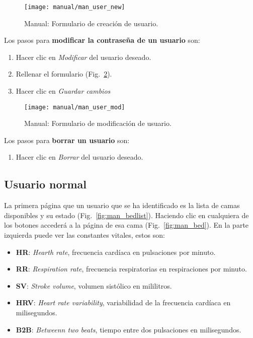 \begin{figure}
	\centering
	\texttt{[image: manual/man\_user\_new]}
	\caption{Manual: Formulario de creación de usuario.}
	\label{fig:man_new_user}
\end{figure}

Los pasos para \textbf{modificar la contraseña de un usuario} son:
\begin{enumerate}
	\item Hacer clic en \textit{Modificar} del usuario deseado.
	\item Rellenar el formulario (Fig.~\ref{fig:man_mod_user}).
	\item Hacer clic en \textit{Guardar cambios}
\end{enumerate}

\begin{figure}
	\centering
	\texttt{[image: manual/man\_user\_mod]}
	\caption{Manual: Formulario de modificación de usuario.}
	\label{fig:man_mod_user}
\end{figure}

Los pasos para \textbf{borrar un usuario} son:
\begin{enumerate}
	\item Hacer clic en \textit{Borrar} del usuario deseado.
\end{enumerate}

\subsection{Usuario normal}\label{sec:normal_tuto}

La primera página que un usuario que se ha identificado es la lista de camas disponibles y su estado (Fig.~\ref{fig:man_bedlist}). Haciendo clic en cualquiera de los botones accederá a la página de esa cama (Fig.~\ref{fig:man_bed}). En la parte izquierda puede ver las constantes vitales, estos son:
\begin{itemize}
	\item \textbf{HR}: \textit{Hearth rate}, frecuencia cardíaca en pulsaciones por minuto.
	\item \textbf{RR}: \textit{Respiration rate}, frecuencia respiratorias en respiraciones por minuto.
	\item \textbf{SV}: \textit{Stroke volume}, volumen sistólico en mililitros.
	\item \textbf{HRV}: \textit{Heart rate variability}, variabilidad de la frecuencia cardíaca en milisegundos.
	\item \textbf{B2B}: \textit{Betweenn two beats}, tiempo entre dos pulsaciones en milisegundos.
\end{itemize}

